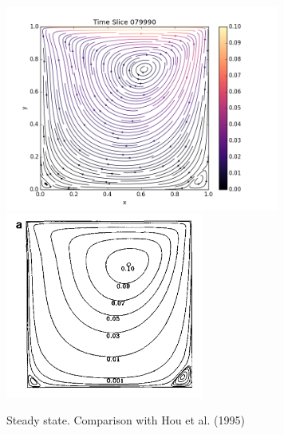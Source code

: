 \documentclass[11pt]{article}
\begin{document}
\begin{center}
\begin{figure}[ht!]
\begin{minipage}{16cm}\label{steady}
\includegraphics[width=9cm]{final}\includegraphics[width=6.5cm]{HouStreamlines}
\end{minipage}
\caption{Steady state. Comparison with Hou et al. (1995)}
\end{figure}
\end{center}
\end{document}
